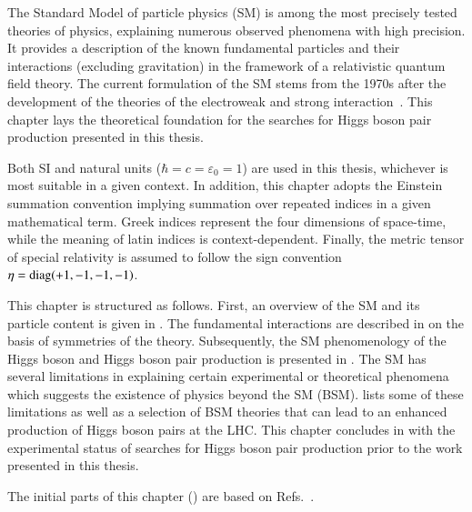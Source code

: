 The Standard Model of particle physics (SM) is among the most precisely tested
theories of physics, explaining numerous observed phenomena with high
precision. It provides a description of the known fundamental particles and
their interactions (excluding gravitation) in the framework of a relativistic
quantum field theory. The current formulation of the SM stems from the 1970s
after the development of the theories of the electroweak and strong
interaction~\cite{Glashow:1961tr,Salam:1964ry,Weinberg:1967tq,Englert:1964et,Higgs:1964pj,tHooft:1971qjg,Fritzsch:1973pi,Gross:1973id,Politzer:1973fx}.
This chapter lays the theoretical foundation for the searches for Higgs boson
pair production presented in this thesis.

Both SI and natural units ($\hbar = c = \varepsilon_0 = 1$) are used in this
thesis, whichever is most suitable in a given context. In addition, this chapter
adopts the Einstein summation convention implying summation over repeated
indices in a given mathematical term. Greek indices represent the four
dimensions of space-time, while the meaning of latin indices is
context-dependent. Finally, the metric tensor of special relativity is assumed
to follow the sign convention $\eta = \operatorname{diag}(+1, -1, -1, -1)$.

This chapter is structured as follows. First, an overview of the SM and its
particle content is given in . The fundamental
interactions are described in  on the
basis of symmetries of the theory. Subsequently, the SM phenomenology of the
Higgs boson and Higgs boson pair production is presented in
. The SM has several limitations in explaining certain
experimental or theoretical phenomena which suggests the existence of physics
beyond the SM (BSM).  lists some of these limitations as well as a
selection of BSM theories that can lead to an enhanced production of Higgs boson
pairs at the LHC. This chapter concludes in  with
the experimental status of searches for Higgs boson pair production prior to the
work presented in this thesis.

The initial parts of this chapter
() are based on
Refs.~\cite{Halzen:1984mc,Thomson:2013zua,Djouadi:2005gi}.

